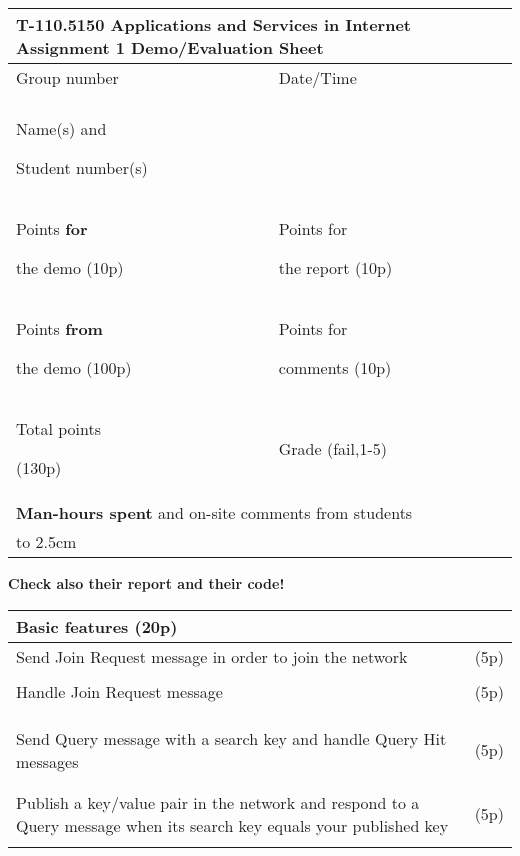\documentclass[12pt, a4paper]{article}
\begin{document}
\begin{table}[htdp]
\begin{center}
\begin{tabular}{|p{3.8cm}|p{3.8cm}|p{3.8cm}|p{3.8cm}|}
\multicolumn{4}{l}{T-110.5150 Applications and Services in Internet Assignment 1 Demo/Evaluation Sheet}\\
\hline
Group number & & Date/Time & \\
& & & \\
\hline
Name(s) and\par Student number(s) & \multicolumn{3}{l|}{}\\
\hline
Points \textbf{for}\par the demo (10p)& & Points for\par the report (10p) & \\
\hline
Points \textbf{from}\par the demo (100p)& & Points for\par comments (10p) & \\
\hline
Total points\par (130p) & & Grade (fail,1-5) & \\
\hline
\multicolumn{4}{|l|}{\textbf{Man-hours spent} and on-site comments from students}\\
\hline
\multicolumn{4}{|l|}{\vbox to 2.5cm {}}\\
\hline
\end{tabular}
\end{center}
\end{table}

\noindent
\textbf{Check also their report and their code!}

\begin{table}[htdp]
\begin{center}
\begin{tabular}{|p{6cm}|p{10cm}|}
\multicolumn{2}{l}{Basic features (20p)}\\
\hline
Send Join Request message in order to join the network & (5p) \\
&\\
\hline
Handle Join Request message & (5p)\\
&\\
&\\
&\\
\hline
Send Query message with a search key and handle Query Hit messages & (5p)  \\
&\\
&\\
\hline
Publish a key/value pair in the network and respond to a Query message when its search key equals your published key & (5p) \\
&\\
\hline
\end{tabular}
\end{center}
\end{table}
\end{document}
